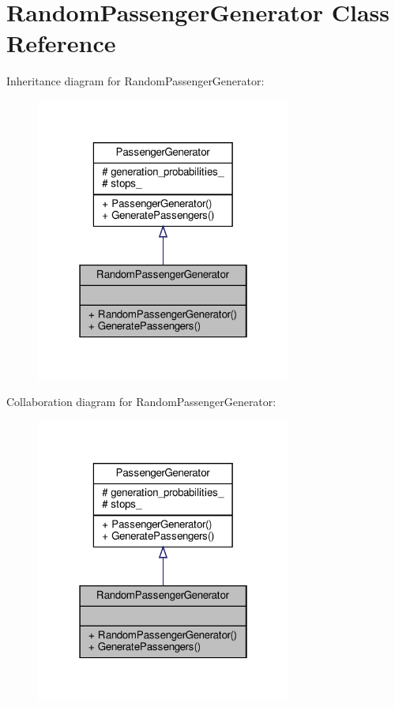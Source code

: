 \hypertarget{classRandomPassengerGenerator}{}\section{Random\+Passenger\+Generator Class Reference}
\label{classRandomPassengerGenerator}


Inheritance diagram for Random\+Passenger\+Generator\+:\nopagebreak
\begin{figure}[H]
\begin{center}
\leavevmode
\includegraphics[width=238pt]{classRandomPassengerGenerator__inherit__graph}
\end{center}
\end{figure}


Collaboration diagram for Random\+Passenger\+Generator\+:\nopagebreak
\begin{figure}[H]
\begin{center}
\leavevmode
\includegraphics[width=238pt]{classRandomPassengerGenerator__coll__graph}
\end{center}
\end{figure}
